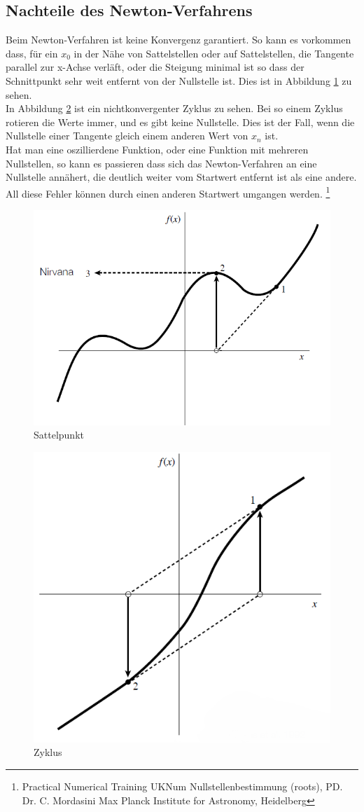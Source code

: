 \documentclass[a4paper,12pt,fleqn,oneside]{article}
\begin{document}
	\subsection{Nachteile des Newton-Verfahrens}
		Beim Newton-Verfahren ist keine Konvergenz garantiert. So kann es vorkommen dass, für ein $x_0$ in der Nähe von Sattelstellen oder auf
		Sattelstellen, die Tangente parallel zur x-Achse verläft, oder die Steigung minimal ist so dass der Schnittpunkt sehr weit entfernt von der
		Nullstelle ist. Dies ist in Abbildung \ref{fig:sattelstelle} zu sehen.\\
		In Abbildung \ref{fig:ring} ist ein nichtkonvergenter Zyklus zu sehen. Bei so einem Zyklus rotieren die Werte immer, und es gibt keine Nullstelle.
		Dies ist der Fall, wenn die Nullstelle einer Tangente gleich einem anderen Wert von $x_n$ ist.\\
		Hat man eine oszillierdene Funktion, oder eine Funktion mit mehreren Nullstellen, so kann es passieren dass sich das Newton-Verfahren an eine
		Nullstelle annähert, die deutlich weiter vom Startwert entfernt ist als eine andere.\\
		All diese Fehler können durch einen anderen Startwert umgangen werden.
		\footnote{Practical Numerical Training UKNum Nullstellenbestimmung (roots), PD. Dr. C. Mordasini Max Planck Institute for Astronomy, Heidelberg}

		\begin{figure}
			\centering
			\includegraphics[width=0.5\linewidth]{Sattelstelle.png}
			\caption{Sattelpunkt}
			\label{fig:sattelstelle}
		\end{figure}
		
		\begin{figure}
			\centering
			\includegraphics[width=0.5\linewidth]{Ring.png}
			\caption{Zyklus}
			\label{fig:ring}
		\end{figure}
		
\end{document}
